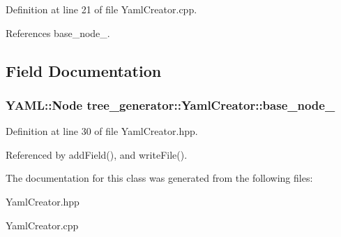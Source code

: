 Definition at line 21 of file Yaml\-Creator.\-cpp.



References base\-\_\-node\-\_\-.



\subsection{Field Documentation}
\hypertarget{classtree__generator_1_1YamlCreator_a0ae64edb8f0e82a7f4b005e4d8462d91_a0ae64edb8f0e82a7f4b005e4d8462d91}{
\subsubsection[{base\-\_\-node\-\_\-}]{\setlength{\rightskip}{0pt plus 5cm}Y\-A\-M\-L\-::\-Node tree\-\_\-generator\-::\-Yaml\-Creator\-::base\-\_\-node\-\_\-\hspace{0.3cm}{\ttfamily [private]}}}\label{classtree__generator_1_1YamlCreator_a0ae64edb8f0e82a7f4b005e4d8462d91_a0ae64edb8f0e82a7f4b005e4d8462d91}


Definition at line 30 of file Yaml\-Creator.\-hpp.



Referenced by add\-Field(), and write\-File().



The documentation for this class was generated from the following files\-:\begin{DoxyCompactItemize}
\item 
Yaml\-Creator.\-hpp\item 
Yaml\-Creator.\-cpp\end{DoxyCompactItemize}
